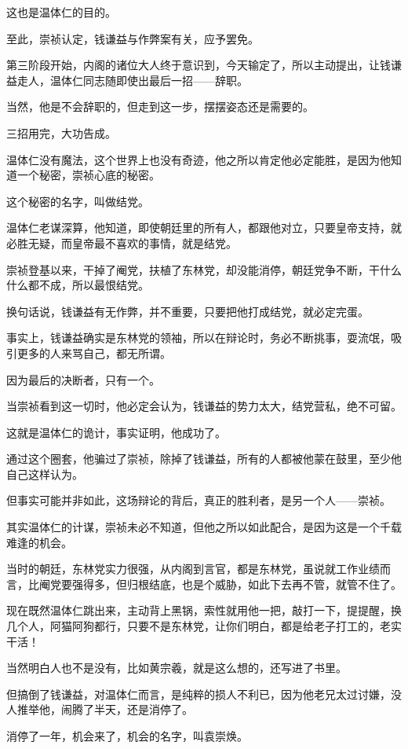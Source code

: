 \begin{multicols}{\theparacolNo}
		这也是温体仁的目的。

		至此，崇祯认定，钱谦益与作弊案有关，应予罢免。

		第三阶段开始，内阁的诸位大人终于意识到，今天输定了，所以主动提出，让钱谦益走人，温体仁同志随即使出最后一招——辞职。

		当然，他是不会辞职的，但走到这一步，摆摆姿态还是需要的。

		三招用完，大功告成。

		温体仁没有魔法，这个世界上也没有奇迹，他之所以肯定他必定能胜，是因为他知道一个秘密，崇祯心底的秘密。

		这个秘密的名字，叫做结党。

		温体仁老谋深算，他知道，即使朝廷里的所有人，都跟他对立，只要皇帝支持，就必胜无疑，而皇帝最不喜欢的事情，就是结党。

		崇祯登基以来，干掉了阉党，扶植了东林党，却没能消停，朝廷党争不断，干什么什么都不成，所以最恨结党。

		换句话说，钱谦益有无作弊，并不重要，只要把他打成结党，就必定完蛋。

		事实上，钱谦益确实是东林党的领袖，所以在辩论时，务必不断挑事，耍流氓，吸引更多的人来骂自己，都无所谓。

		因为最后的决断者，只有一个。

		当崇祯看到这一切时，他必定会认为，钱谦益的势力太大，结党营私，绝不可留。

		这就是温体仁的诡计，事实证明，他成功了。

		通过这个圈套，他骗过了崇祯，除掉了钱谦益，所有的人都被他蒙在鼓里，至少他自己这样认为。

		但事实可能并非如此，这场辩论的背后，真正的胜利者，是另一个人——崇祯。

		其实温体仁的计谋，崇祯未必不知道，但他之所以如此配合，是因为这是一个千载难逢的机会。

		当时的朝廷，东林党实力很强，从内阁到言官，都是东林党，虽说就工作业绩而言，比阉党要强得多，但归根结底，也是个威胁，如此下去再不管，就管不住了。

		现在既然温体仁跳出来，主动背上黑锅，索性就用他一把，敲打一下，提提醒，换几个人，阿猫阿狗都行，只要不是东林党，让你们明白，都是给老子打工的，老实干活！

		当然明白人也不是没有，比如黄宗羲，就是这么想的，还写进了书里。

		但搞倒了钱谦益，对温体仁而言，是纯粹的损人不利已，因为他老兄太过讨嫌，没人推举他，闹腾了半天，还是消停了。

		消停了一年，机会来了，机会的名字，叫袁崇焕。


\end{multicols}
